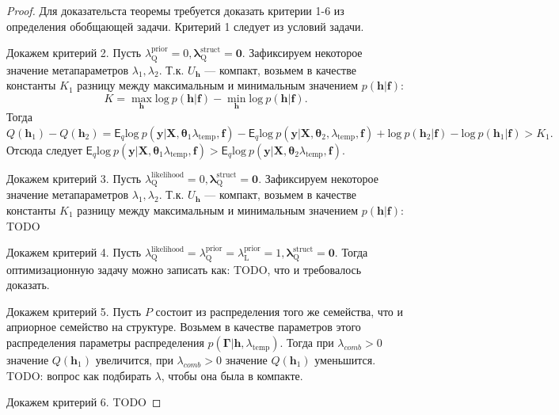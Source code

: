 \begin{proof}
Для доказательста теоремы требуется доказать критерии 1-6 из определения обобщающей задачи.
Критерий 1 следует из условий задачи.

Докажем критерий 2. Пусть $\lambda^\text{prior}_\text{Q} = 0, \boldsymbol{\lambda}^\text{struct}_\text{Q} = \mathbf{0}$. Зафиксируем некоторое значение метапараметров $\lambda_1, \lambda_2$. Т.к. $U_\mathbf{h}$ --- компакт, возьмем в качестве константы $K_1$ разницу между максимальным и минимальным значением $p(\mathbf{h}|\mathbf{f})$:
\[
    K = \max_{\mathbf{h}} \text{log}~p (\mathbf{h}|\mathbf{f}) - \min_{\mathbf{h}} \text{log}~p(\mathbf{h}|\mathbf{f}).
\]
Тогда $Q(\mathbf{h}_1) - Q(\mathbf{h}_2) = \mathsf{E}_q \text{log}~p(\mathbf{y}|\mathbf{X}, \boldsymbol{\theta}_1 \lambda_{\text{temp}}, \mathbf{f}) - \mathsf{E}_q \text{log}~p(\mathbf{y}|\mathbf{X}, \boldsymbol{\theta}_2, \lambda_{\text{temp}}, \mathbf{f}) + \text{log}~p(\mathbf{h}_2|\mathbf{f}) - \text{log}~p(\mathbf{h}_1|\mathbf{f})>K_1.$ Отсюда следует $\mathsf{E}_q \text{log}~p(\mathbf{y}|\mathbf{X}, \boldsymbol{\theta}_1 \lambda_{\text{temp}}, \mathbf{f}) > \mathsf{E}_q \text{log}~p(\mathbf{y}|\mathbf{X}, \boldsymbol{\theta}_2 \lambda_{\text{temp}}, \mathbf{f}).$

Докажем критерий 3.  Пусть $\lambda^\text{likelihood}_\text{Q} = 0, \boldsymbol{\lambda}^\text{struct}_\text{Q} = \mathbf{0}$. Зафиксируем некоторое значение метапараметров $\lambda_1, \lambda_2$. Т.к. $U_\mathbf{h}$ --- компакт, возьмем в качестве константы $K_1$ разницу между максимальным и минимальным значением $p(\mathbf{h}|\mathbf{f})$:
TODO

Докажем критерий 4. Пусть $\lambda^\text{likelihood}_\text{Q} = \lambda^\text{prior}_\text{Q}=\lambda^\text{prior}_\text{L}=1, \boldsymbol{\lambda}^\text{struct}_\text{Q} = \mathbf{0}$. Тогда оптимизационную задачу можно записать как: TODO, что и требовалось доказать.

Докажем критерий 5. Пусть $P$ состоит из распределения того же семейства, что и априорное семейство на структуре. Возьмем в качестве параметров этого распределения параметры распределения $p(\boldsymbol{\Gamma}|\mathbf{h}, \lambda_\text{temp}).$ Тогда при $\lambda_{comb}>0$ значение $Q(\mathbf{h}_1)$ увеличится, при  $\lambda_{comb}>0$ значение $Q(\mathbf{h}_1)$  уменьшится. TODO: вопрос как подбирать $\lambda$, чтобы она была в компакте.

Докажем критерий 6. TODO
\end{proof}

